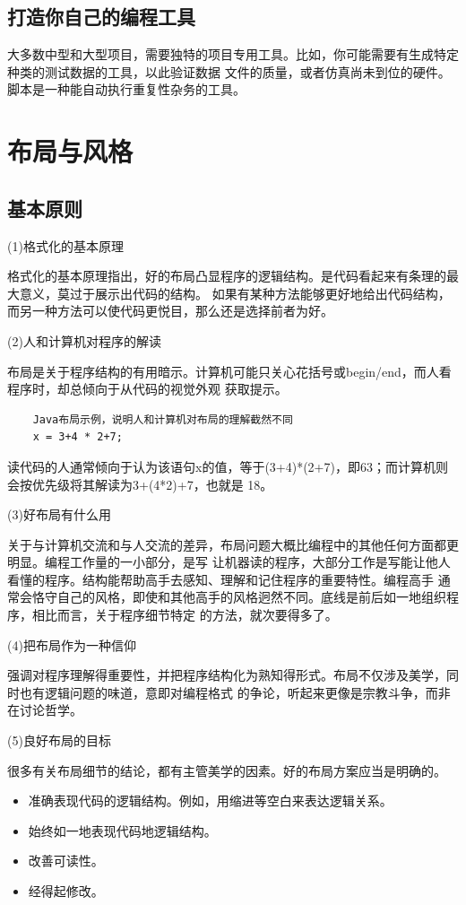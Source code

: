\documentclass{article}
\begin{document}
\subsection{打造你自己的编程工具}
大多数中型和大型项目，需要独特的项目专用工具。比如，你可能需要有生成特定种类的测试数据的工具，以此验证数据
文件的质量，或者仿真尚未到位的硬件。脚本是一种能自动执行重复性杂务的工具。

\section{布局与风格}
\subsection{基本原则}
\par
(1)格式化的基本原理
\par
格式化的基本原理指出，好的布局凸显程序的逻辑结构。是代码看起来有条理的最大意义，莫过于展示出代码的结构。
如果有某种方法能够更好地给出代码结构，而另一种方法可以使代码更悦目，那么还是选择前者为好。

\par
(2)人和计算机对程序的解读
\par
布局是关于程序结构的有用暗示。计算机可能只关心花括号或begin/end，而人看程序时，却总倾向于从代码的视觉外观
获取提示。
\begin{lstlisting}
    Java布局示例，说明人和计算机对布局的理解截然不同
    x = 3+4 * 2+7;
\end{lstlisting}
读代码的人通常倾向于认为该语句x的值，等于(3+4)*(2+7)，即63；而计算机则会按优先级将其解读为3+(4*2)+7，也就是
18。

\par
(3)好布局有什么用
\par
关于与计算机交流和与人交流的差异，布局问题大概比编程中的其他任何方面都更明显。编程工作量的一小部分，是写
让机器读的程序，大部分工作是写能让他人看懂的程序。结构能帮助高手去感知、理解和记住程序的重要特性。编程高手
通常会恪守自己的风格，即使和其他高手的风格迥然不同。底线是前后如一地组织程序，相比而言，关于程序细节特定
的方法，就次要得多了。

\par
(4)把布局作为一种信仰
\par
强调对程序理解得重要性，并把程序结构化为熟知得形式。布局不仅涉及美学，同时也有逻辑问题的味道，意即对编程格式
的争论，听起来更像是宗教斗争，而非在讨论哲学。

\par
(5)良好布局的目标
\par
很多有关布局细节的结论，都有主管美学的因素。好的布局方案应当是明确的。
\begin{itemize}
    \item 准确表现代码的逻辑结构。例如，用缩进等空白来表达逻辑关系。
    \item 始终如一地表现代码地逻辑结构。
    \item 改善可读性。
    \item 经得起修改。
\end{itemize}
\end{document}

